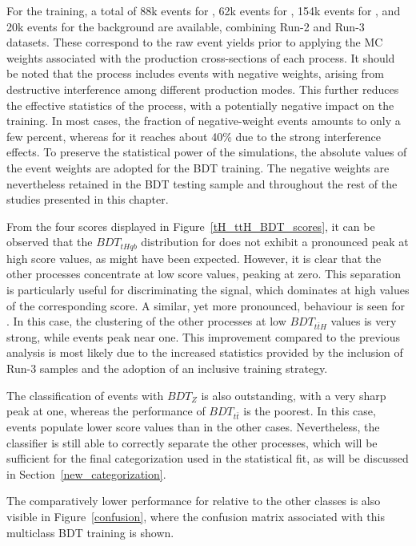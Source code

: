 For the training, a total of 88k events for \ttH, 62k events for \thqb, 154k events for \ztautau, and 20k events for the \ttbar background are available, combining Run-2 and Run-3 datasets. These correspond to the raw event yields prior to applying the MC weights associated with the production cross-sections of each process. It should be noted that the \thqb process includes events with negative weights, arising from destructive interference among different production modes. This further reduces the effective statistics of the process, with a potentially negative impact on the training. In most cases, the fraction of negative-weight events amounts to only a few percent, whereas for \thqb it reaches about 40\% due to the strong interference effects. To preserve the statistical power of the \thqb simulations, the absolute values of the event weights are adopted for the BDT training. The negative weights are nevertheless retained in the BDT testing sample and throughout the rest of the studies presented in this chapter.

From the four scores displayed in Figure~\ref{tH_ttH_BDT_scores}, it can be observed that the $BDT_{tHqb}$ distribution for \thqb does not exhibit a pronounced peak at high score values, as might have been expected. However, it is clear that the other processes concentrate at low score values, peaking at zero. This separation is particularly useful for discriminating the \thqb signal, which dominates at high values of the corresponding score. A similar, yet more pronounced, behaviour is seen for \tth. In this case, the clustering of the other processes at low $BDT_{t\bar{t}H}$ values is very strong, while \ttH events peak near one. This improvement compared to the previous analysis is most likely due to the increased statistics provided by the inclusion of Run-3 samples and the adoption of an inclusive training strategy.

The classification of \ztautau events with $BDT_{Z}$ is also outstanding, with a very sharp peak at one, whereas the performance of $BDT_{t\bar{t}}$ is the poorest. In this case, \ttbar events populate lower score values than in the other cases. Nevertheless, the classifier is still able to correctly separate the other processes, which will be sufficient for the final categorization used in the statistical fit, as will be discussed in Section~\ref{new_categorization}.

The comparatively lower performance for \ttbar relative to the other classes is also visible in Figure~\ref{confusion}, where the confusion matrix associated with this multiclass BDT training is shown.

